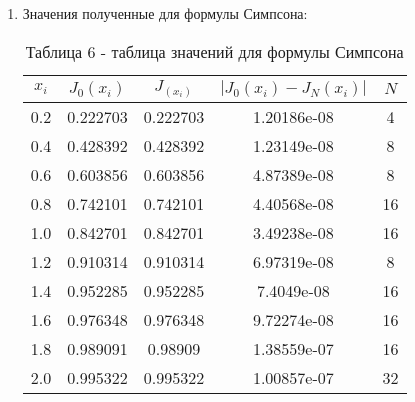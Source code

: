 \documentclass[a4paper,12pt]{article}
\begin{document}
{\begin{enumerate}[label = \arabic*.]
\begin{enumerate}
{            \hfill\break
            Тогда:
            \begin{equation}
                \int\limits_{a}^{b}L_2(x)\mathrm{d}x = \frac{b-a}{6}\left(f(a) + 4f\left(\frac{a+b}{2}\right)+f(b)\right)
            \end{equation}
            }
            \item {Значения полученные для формулы Симпсона:
            \begin{table}[h]
            \centering
            \begin{tabular}{|c|c|c|c|c|}
                \hline
                $x_i$ & $J_0(x_i)$ & $J_(x_i)$ & $\left|J_0(x_i) - J_N(x_i)\right|$ & $N$\\
                \hline
                0.2 &  0.222703 &  0.222703 & 1.20186e-08 & 4\\
                \hline
                0.4 &  0.428392 &  0.428392 & 1.23149e-08 & 8\\
                \hline
                0.6 &  0.603856 &  0.603856 & 4.87389e-08 & 8\\
                \hline
                0.8 &  0.742101 &  0.742101 & 4.40568e-08 & 16\\
                \hline
                1.0 &  0.842701 &  0.842701 & 3.49238e-08 & 16\\
                \hline
                1.2 &  0.910314 &  0.910314 & 6.97319e-08 & 8\\
                \hline
                1.4 &  0.952285 &  0.952285 &  7.4049e-08 & 16\\
                \hline
                1.6 &  0.976348 &  0.976348 & 9.72274e-08 & 16\\
                \hline
                1.8 &  0.989091 &   0.98909 & 1.38559e-07 & 16\\
                \hline
                2.0 &  0.995322 &  0.995322 & 1.00857e-07 & 32\\
                \hline
            \end{tabular}
            \caption*{\small{Таблица 6 - таблица значений для формулы Симпсона}}
            \end{table}
            }
        \end{enumerate}
        \newpage


\end{enumerate}}
\end{document}
